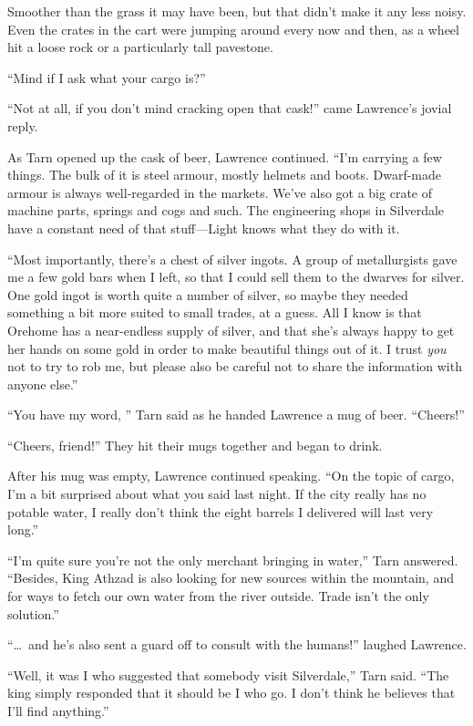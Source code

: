 Smoother than the grass it may have been, but that didn't make it any less noisy.  Even the crates in the cart were jumping around every now and then, as a wheel hit a loose rock or a particularly tall pavestone.

``Mind if I ask what your cargo is?''

``Not at all, if you don't mind cracking open that cask!'' came Lawrence's jovial reply.

As Tarn opened up the cask of beer, Lawrence continued.  ``I'm carrying a few things.  The bulk of it is steel armour, mostly helmets and boots.  Dwarf-made armour is always well-regarded in the markets.  We've also got a big crate of machine parts, springs and cogs and such.  The engineering shops in Silverdale have a constant need of that stuff---Light knows what they do with it.

``Most importantly, there's a chest of silver ingots.  A group of metallurgists gave me a few gold bars when I left, so that I could sell them to the dwarves for silver.  One gold ingot is worth quite a number of silver, so maybe they needed something a bit more suited to small trades, at a guess.  All I know is that Orehome has a near-endless supply of silver, and that she's always happy to get her hands on some gold in order to make beautiful things out of it.  I trust \emph{you} not to try to rob me, but please also be careful not to share the information with anyone else.''

``You have my word, '' Tarn said as he handed Lawrence a mug of beer.  ``Cheers!''

``Cheers, friend!''  They hit their mugs together and began to drink.

After his mug was empty, Lawrence continued speaking.  ``On the topic of cargo, I'm a bit surprised about what you said last night.  If the city really has no potable water, I really don't think the eight barrels I delivered will last very long.''

``I'm quite sure you're not the only merchant bringing in water,'' Tarn answered.  ``Besides, King Athzad is also looking for new sources within the mountain, and for ways to fetch our own water from the river outside.  Trade isn't the only solution.''

``\ldots\ and he's also sent a guard off to consult with the humans!'' laughed Lawrence.

``Well, it was I who suggested that somebody visit Silverdale,'' Tarn said.  ``The king simply responded that it should be I who go.  I don't think he believes that I'll find anything.''

